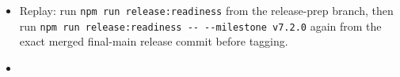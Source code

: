 \begin{itemize}
\item
  Replay: run \texttt{n\allowbreak{}p\allowbreak{}m\allowbreak{} \allowbreak{}r\allowbreak{}u\allowbreak{}n\allowbreak{} \allowbreak{}r\allowbreak{}e\allowbreak{}l\allowbreak{}e\allowbreak{}a\allowbreak{}s\allowbreak{}e\allowbreak{}:\allowbreak{}r\allowbreak{}e\allowbreak{}a\allowbreak{}d\allowbreak{}i\allowbreak{}n\allowbreak{}e\allowbreak{}s\allowbreak{}s} from the release-prep branch, then run \texttt{n\allowbreak{}p\allowbreak{}m\allowbreak{} \allowbreak{}r\allowbreak{}u\allowbreak{}n\allowbreak{} \allowbreak{}r\allowbreak{}e\allowbreak{}l\allowbreak{}e\allowbreak{}a\allowbreak{}s\allowbreak{}e\allowbreak{}:\allowbreak{}r\allowbreak{}e\allowbreak{}a\allowbreak{}d\allowbreak{}i\allowbreak{}n\allowbreak{}e\allowbreak{}s\allowbreak{}s\allowbreak{} \allowbreak{}-\allowbreak{}-\allowbreak{} \allowbreak{}-\allowbreak{}-\allowbreak{}m\allowbreak{}i\allowbreak{}l\allowbreak{}e\allowbreak{}s\allowbreak{}t\allowbreak{}o\allowbreak{}n\allowbreak{}e\allowbreak{} \allowbreak{}v\allowbreak{}7\allowbreak{}.\allowbreak{}2\allowbreak{}.\allowbreak{}0} again from the exact merged final-main release commit before tagging.
\item

\end{itemize}
